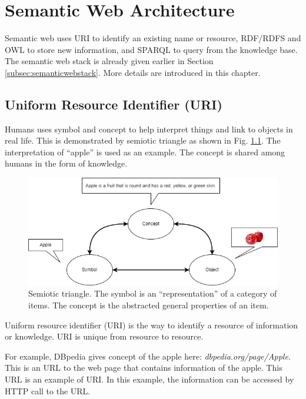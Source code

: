 \chapter{Semantic Web Architecture}

Semantic web uses URI to identify an existing name or resource, RDF/RDFS and OWL to store new information, and SPARQL to query from the knowledge base. The semantic web stack is already given earlier in Section \ref{subsec:semanticwebstack}. More details are introduced in this chapter.

\section{Uniform Resource Identifier (URI)}

Humans uses symbol and concept to help interpret things and link to objects in real life. This is demonstrated by semiotic triangle as shown in Fig. \ref{fig:semiotictriangle}. The interpretation of ``apple'' is used as an example. The concept is shared among humans in the form of knowledge.

\begin{figure}[htbp]
	\centering
	\includegraphics[width=\textwidth]{./chapters/ch-semanticwebarchitecture/figures/semiotic_triangle.png}
	\caption{Semiotic triangle. The symbol is an ``representation'' of a category of items. The concept is the abstracted general properties of an item.}
	\label{fig:semiotictriangle}
\end{figure} 

Uniform resource identifier (URI) is the way to identify a resource of information or knowledge. URI is unique from resource to resource. 

For example, DBpedia gives concept of the apple here: \textit{dbpedia.org/page/Apple}. This is an URL to the web page that contains information of the apple. This URL is an example of URI. In this example, the information can be accessed by HTTP call to the URL.

